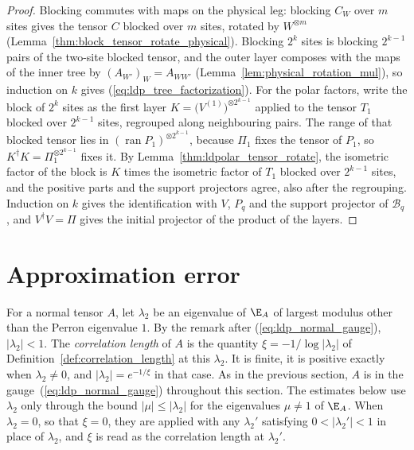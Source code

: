 \begin{proof}
    \leanok
    Blocking commutes with maps on the physical leg: blocking $C_W$ over $m$
    sites gives the tensor $C$ blocked over $m$ sites, rotated by
    $W^{\otimes m}$ (Lemma~\ref{thm:block_tensor_rotate_physical}). Blocking
    $2^{k}$ sites is blocking $2^{k-1}$ pairs of the two-site blocked tensor,
    and the outer layer composes with the maps of the inner tree by
    $(A_{W'})_W=A_{WW'}$
    (Lemma~\ref{lem:physical_rotation_mul}), so induction on $k$ gives
    (\ref{eq:ldp_tree_factorization}).
    For the polar factors, write the block of $2^{k}$ sites as the first layer
    $K=\bigl(V^{(1)}\bigr)^{\otimes2^{k-1}}$ applied to the tensor $T_1$ blocked
    over $2^{k-1}$ sites, regrouped along neighbouring pairs. The range of that
    blocked tensor lies in $(\operatorname{ran}P_1)^{\otimes2^{k-1}}$, because
    $\Pi_1$ fixes the tensor of $P_1$, so $K^\dagger K=\Pi_1^{\otimes2^{k-1}}$
    fixes it. By Lemma~\ref{thm:ldpolar_tensor_rotate}, the isometric factor of
    the block is $K$ times the isometric factor of $T_1$ blocked over $2^{k-1}$
    sites, and the positive parts and the support projectors agree, also after
    the regrouping. Induction on $k$ gives the identification with $V$, $P_q$
    and the support projector of $\mathcal B_q$, and $V^\dagger V=\Pi$ gives
    the initial projector of the product of the layers.
\end{proof}

\section{Approximation error}

For a normal tensor $A$, let $\lambda_2$ be an eigenvalue of $\E_A$ of
largest modulus other than the Perron eigenvalue $1$. By the remark after
(\ref{eq:ldp_normal_gauge}), $\lvert\lambda_2\rvert<1$. The
\emph{correlation length} of $A$ is the quantity
$\xi=-1/\log\lvert\lambda_2\rvert$ of Definition~\ref{def:correlation_length}
at this $\lambda_2$. It is finite, it is positive exactly when
$\lambda_2\neq0$, and $\lvert\lambda_2\rvert=e^{-1/\xi}$ in that case.
As in the previous section, $A$ is in the gauge~(\ref{eq:ldp_normal_gauge})
throughout this section. The estimates below use $\lambda_2$ only through the
bound $\lvert\mu\rvert\le\lvert\lambda_2\rvert$ for the eigenvalues $\mu\ne1$
of $\E_A$. When $\lambda_2=0$, so that $\xi=0$, they are applied with any
$\lambda_2'$ satisfying $0<\lvert\lambda_2'\rvert<1$ in place of $\lambda_2$,
and $\xi$ is read as the correlation length at $\lambda_2'$.

